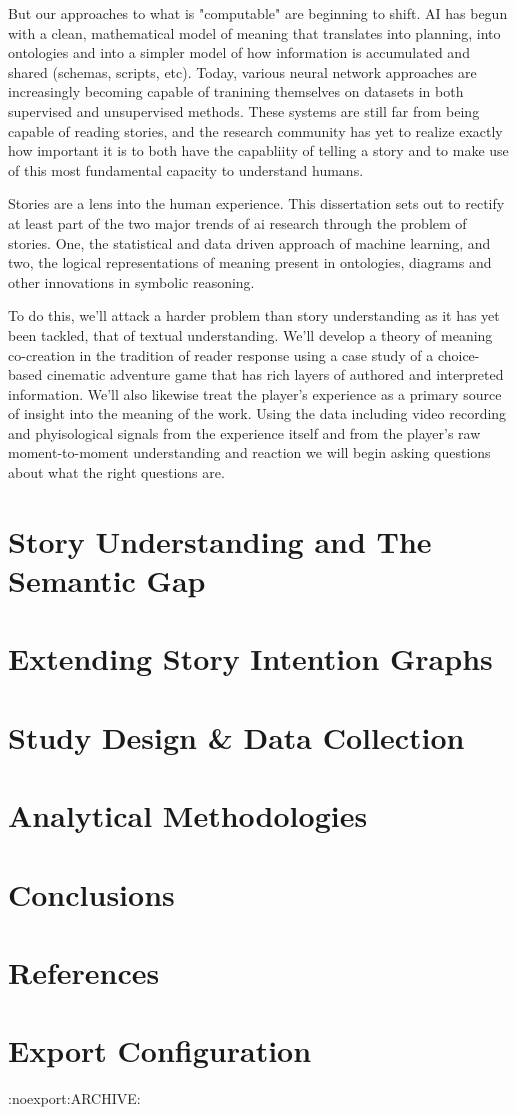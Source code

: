 \documentclass[11pt]{article}
\begin{document}
But our approaches to what is "computable" are beginning to shift. AI
has begun with a clean, mathematical model of meaning that translates
into planning, into ontologies and into a simpler model of how
information is accumulated and shared (schemas, scripts, etc). Today,
various neural network approaches are increasingly becoming capable of
tranining themselves on datasets in both supervised and unsupervised
methods. These systems are still far from being capable of reading
stories, and the research community has yet to realize exactly how
important it is to both have the capabliity of telling a story and to
make use of this most fundamental capacity to understand humans.

Stories are a lens into the human experience. This dissertation sets
out to rectify at least part of the two major trends of ai research
through the problem of stories. One, the statistical and data driven
approach of machine learning, and two, the logical representations of
meaning present in ontologies, diagrams and other innovations in
symbolic reasoning.

To do this, we'll attack a harder problem than story understanding as
it has yet been tackled, that of textual understanding. We'll develop
a theory of meaning co-creation in the tradition of reader response
using a case study of a choice-based cinematic adventure game that has
rich layers of authored and interpreted information. We'll also
likewise treat the player's experience as a primary source of insight
into the meaning of the work. Using the data including video recording
and phyisological signals from the experience itself and from the
player's raw moment-to-moment understanding and reaction we will begin
asking questions about what the right questions are.
\section{Story Understanding and The Semantic Gap}
\label{sec:org61c1160}

\section{Extending Story Intention Graphs}
\label{sec:orge99a8ec}

\section{Study Design \& Data Collection}
\label{sec:org4b54a99}

\section{Analytical Methodologies}
\label{sec:orgc2b755d}

\section{Conclusions}
\label{sec:orgd1e81c0}

\section{References}
\label{sec:org384c9d6}



\section{Export Configuration}
\label{sec:org1cb39ee}
:noexport:ARCHIVE:
\end{document}
